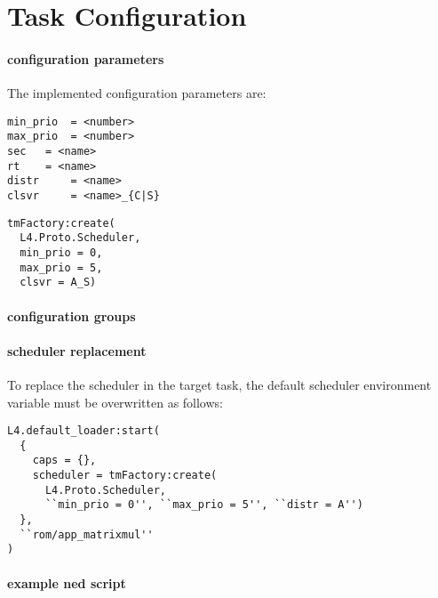 \section{Task Configuration}
\label{impl:config}

\paragraph{configuration parameters}
The implemented configuration parameters are:

\begin{lstlisting}
min_prio  = <number>
max_prio  = <number>
sec	  = <name>
rt	  = <name>
distr	  = <name>
clsvr	  = <name>_{C|S}
\end{lstlisting}

\begin{lstlisting}
tmFactory:create(
  L4.Proto.Scheduler, 
  min_prio = 0, 
  max_prio = 5,
  clsvr = A_S)
\end{lstlisting}


\paragraph{configuration groups}

\paragraph{scheduler replacement}
To replace the scheduler in the target task, the default scheduler environment
variable must be overwritten as follows:

\begin{lstlisting}
L4.default_loader:start(
  { 
    caps = {},
    scheduler = tmFactory:create(
      L4.Proto.Scheduler, 
      ``min_prio = 0'', ``max_prio = 5'', ``distr = A'')
  },
  ``rom/app_matrixmul''
)
\end{lstlisting}

\paragraph{example ned script}

